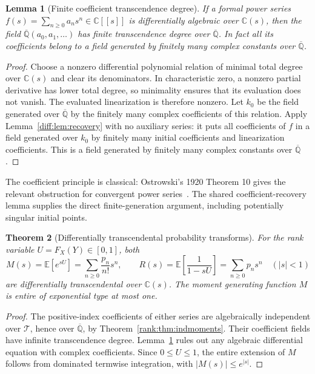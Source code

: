 \documentclass[11pt,a4paper]{article}
\newcommand{\Qbar}{\overline{\mathbb Q}}
\newcommand{\T}{\mathcal T}
\newcommand{\EE}{\mathbb E}
\newtheorem{theorem}{Theorem}[section]
\newtheorem{lemma}[theorem]{Lemma}
\theoremstyle{definition}
\theoremstyle{remark}
\numberwithin{equation}{section}
\begin{document}
\begin{lemma}[Finite coefficient transcendence degree]\label{rank:lem:DA}
If a formal power series $f(s)=\sum_{n\ge0}a_ns^n\in\mathbb C[[s]]$
is differentially algebraic over $\mathbb C(s)$, then the field
$\Qbar(a_0,a_1,\ldots)$ has finite transcendence degree over $\Qbar$.
In fact all its coefficients belong to a field generated by finitely
many complex constants over $\Qbar$.
\end{lemma}
\begin{proof}
Choose a nonzero differential polynomial relation of minimal total
degree over $\mathbb C(s)$ and clear its denominators. In characteristic
zero, a nonzero partial derivative has lower total degree, so minimality
ensures that its evaluation does not vanish. The evaluated
linearization is therefore nonzero. Let $k_0$ be the field generated
over $\Qbar$ by the finitely many complex coefficients of this relation.
Apply Lemma~\ref{diff:lem:recovery} with no auxiliary series: it puts
all coefficients of $f$ in a field generated over $k_0$ by finitely
many initial coefficients and linearization coefficients. This is
a field generated by finitely many complex constants over $\Qbar$.
\end{proof}

The coefficient principle is classical: Ostrowski's 1920
Theorem 10 gives the relevant obstruction for convergent power
series~\cite{Ostrowski,Translation}. The shared coefficient-recovery
lemma supplies the direct finite-generation argument, including
potentially singular initial points.

\begin{theorem}[Differentially transcendental probability transforms]
For the rank variable $U=F_X(Y)\in[0,1]$, both
\[
 M(s)=\EE[e^{sU}]=\sum_{n\ge0}\frac{p_n}{n!}s^n,
 \qquad
 R(s)=\EE\!\left[\frac1{1-sU}\right]
       =\sum_{n\ge0}p_ns^n\quad(|s|<1)
\]
are differentially transcendental over $\mathbb C(s)$.
The moment generating function $M$ is entire of exponential type
at most one.
\end{theorem}
\begin{proof}
The positive-index coefficients of either series are algebraically
independent over $\T$, hence over $\Qbar$, by
Theorem~\ref{rank:thm:indmoments}. Their coefficient fields have infinite
transcendence degree. Lemma~\ref{rank:lem:DA} rules out any algebraic
differential equation with complex coefficients. Since $0\le U\le1$,
the entire extension of $M$ follows from dominated termwise integration,
with $|M(s)|\le e^{|s|}$.
\end{proof}
\end{document}
